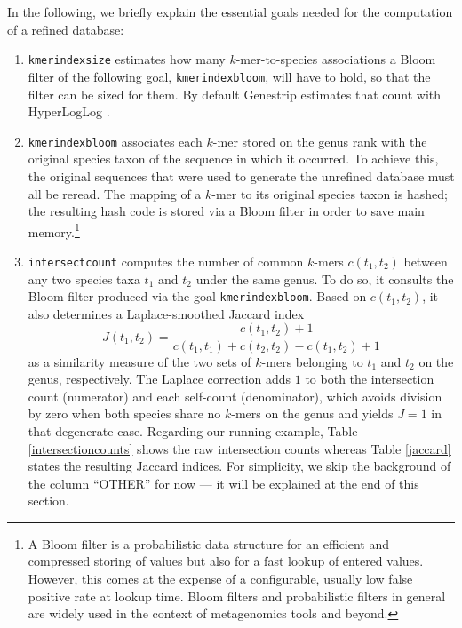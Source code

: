 \documentclass[pdflatex,sn-vancouver-num]{sn-jnl}
\begin{document}
In the following, we briefly explain the essential goals needed for the computation of a refined database:
\begin{enumerate}
	\item \verb|kmerindexsize| estimates how many $k$-mer-to-species associations a Bloom filter of the following goal, \verb|kmerindexbloom|, will have to hold, so that the filter can be sized for them. By default Genestrip estimates that count with HyperLogLog \cite{Flajolet07hyperloglog}.

	\item \verb|kmerindexbloom| associates each $k$-mer stored on the genus rank with the original species taxon of the sequence in which it occurred. To achieve this, the original sequences that were used to generate the unrefined database must all be reread. The mapping of a $k$-mer to its original species taxon is hashed; the resulting hash code is stored via a Bloom filter \cite{bloomfilter} in order to save main memory.\footnote{A Bloom filter is a probabilistic data structure for an efficient and compressed storing of values but also for a fast lookup of entered values. However, this comes at the expense of a configurable, usually low false positive rate at lookup time. Bloom filters and probabilistic filters in general \cite{10.1145/2674005.2674994,9920402,10.1145/3510449,10.1145/3376122} are widely used in the context of metagenomics tools \cite{biobloom, Piro:2020aa, 10.1093/nargab/lqaf094} and beyond.}
	
	\item \verb|intersectcount| computes the number of common $k$-mers $c(t_1, t_2)$ between any two species taxa $t_1$ and $t_2$ under the same genus. To do so, it consults the Bloom filter produced via the goal \verb|kmerindexbloom|. Based on $c(t_1, t_2)$, it also determines a Laplace-smoothed Jaccard index
	\[ J(t_1, t_2) = \frac{c(t_1, t_2) + 1}{c(t_1, t_1) + c(t_2, t_2) - c(t_1, t_2) + 1} \]
	\cite{jaccard} as a similarity measure of the two sets of $k$-mers belonging to $t_1$ and $t_2$ on the genus, respectively. The Laplace correction adds $1$ to both the intersection count (numerator) and each self-count (denominator), which avoids division by zero when both species share no $k$-mers on the genus and yields $J = 1$ in that degenerate case. Regarding our running example, Table \ref{intersectioncounts} shows the raw intersection counts whereas Table \ref{jaccard} states the resulting Jaccard indices. For simplicity, we skip the background of the column \enquote{OTHER} for now --- it will be explained at the end of this section.


\end{enumerate}
\end{document}
